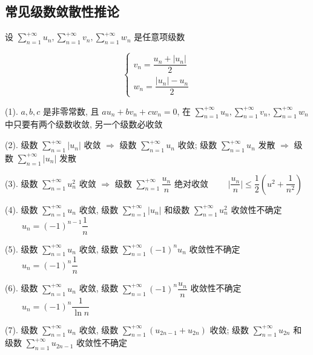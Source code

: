 \subsection{常见级数敛散性推论}
\begin{corollary}
	设 $\sum\limits_{n=1}^{+\infty} u_{n}, \sum\limits_{n=1}^{+\infty}v_{n}, \sum\limits_{n=1}^{+\infty}w_{n}$ 是任意项级数

	$$\begin{cases}
  		v_{n} = \dfrac{u_{n} + |u_{n}|}{2} \\
  		w_{n} = \dfrac{|u_{n}| - u_{n}}{2}
	\end{cases}$$

	(1). $a, b, c$ 是非零常数, 且 $au_{n} + bv_{n} + cw_{n} = 0$, 在 $\sum\limits_{n=1}^{+\infty} u_{n}, \sum\limits_{n=1}^{+\infty}v_{n}, \sum\limits_{n=1}^{+\infty}w_{n}$ 
	中只要有两个级数收敛, 另一个级数必收敛

	(2). 级数 $\sum\limits_{n=1}^{+\infty}|u_{n}|$ 收敛 $\Rightarrow$ 级数 $\sum\limits_{n=1}^{+\infty}u_{n}$ 收敛; 级数 $\sum\limits_{n=1}^{+\infty}u_{n}$ 发散 $\Rightarrow$ 级数 $\sum\limits_{n=1}^{+\infty}|u_{n}|$ 发散

	(3). 级数 $\sum\limits_{n=1}^{+\infty}u^{2}_{n}$ 收敛 $\Rightarrow$ 级数 $\sum\limits_{n=1}^{+\infty}\dfrac{u_{n}}{n}$ 绝对收敛 $\qquad \big|\dfrac{u_{n}}{n}\big| \leq \dfrac{1}{2}(u^{2}+\dfrac{1}{n^{2}})$

	(4).  级数 $\sum\limits_{n=1}^{+\infty}u_{n}$ 收敛, 级数 $\sum\limits_{n=1}^{+\infty}|u_{n}|$ 和级数 $\sum\limits_{n=1}^{+\infty}u^{2}_{n}$ 收敛性不确定 $\qquad u_{n} = (-1)^{n-1}\dfrac{1}{n}$

	(5). 级数 $\sum\limits_{n=1}^{+\infty}u_{n}$ 收敛, 级数 $\sum\limits_{n=1}^{+\infty}(-1)^{n}u_{n}$ 收敛性不确定 $\qquad u_{n} = (-1)^{n}\dfrac{1}{n}$

	(6). 级数 $\sum\limits_{n=1}^{+\infty}u_{n}$ 收敛, 级数 $\sum\limits_{n=1}^{+\infty}(-1)^{n}\dfrac{u_{n}}{n}$ 收敛性不确定 $\qquad u_{n} = (-1)^{n}\dfrac{1}{\ln n}$

	(7). 级数 $\sum\limits_{n=1}^{+\infty}u_{n}$ 收敛, 级数 $\sum\limits_{n=1}^{+\infty}(u_{2n-1}+u_{2n})$ 收敛; 级数 $\sum\limits_{n=1}^{+\infty}u_{2n}$ 和级数 $\sum\limits_{n=1}^{+\infty}u_{2n-1}$ 收敛性不确定
\end{corollary}
